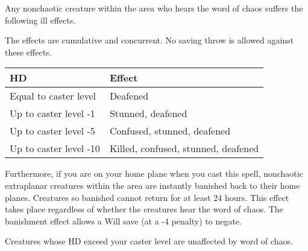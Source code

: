 \begin{multicols}{2}
\begin{small}
\noindent Any nonchaotic creature within the area who hears the word of chaos suffers the following ill effects.

\smallskip\noindent The effects are cumulative and concurrent. No saving throw is allowed against these effects.

 
\begin{center}
\begin{tabular}[h!]{l|l}
HD & Effect \\ \hline
Equal to caster level & Deafened \\
Up to caster level -1 & Stunned, deafened	\\
Up to caster level -5	& Confused, stunned, deafened	\\
Up to caster level -10 & Killed, confused, stunned, deafened \\
\end{tabular}
\end{center}

\smallskip\noindent Furthermore, if you are on your home plane when you cast this spell, nonchaotic extraplanar creatures within the area are instantly banished back to their home planes. Creatures so banished cannot return for at least 24 hours. This effect takes place regardless of whether the creatures hear the word of chaos. The banishment effect allows a Will save (at a -4 penalty) to negate.

\smallskip\noindent Creatures whose HD exceed your caster level are unaffected by word of chaos.


\end{small}
\end{multicols}
